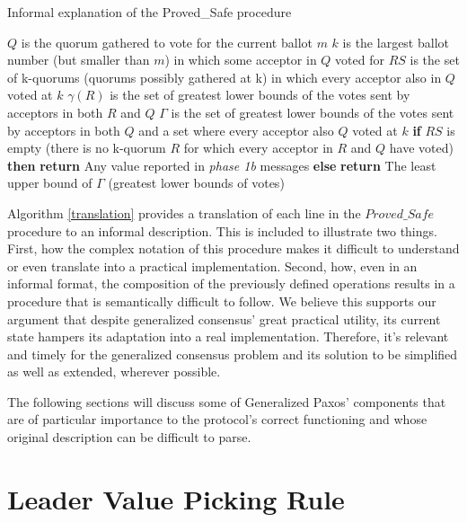 \begin{algorithm}
	\caption{Informal explanation of the Proved\_Safe procedure}
	\label{translation}
	\begin{algorithmic}[1]
		\State $Q$ is the quorum gathered to vote for the current ballot $m$
		\State $k$ is the largest ballot number (but smaller than $m$) in which some acceptor in $Q$ voted for 
		\State $RS$ is the set of k-quorums (quorums possibly gathered at k) in which every acceptor also in $Q$ voted at $k$
		\State $\gamma(R)$ is the set of greatest lower bounds of the votes sent by acceptors in both $R$ and $Q$
		\State $\Gamma$ is the set of greatest lower bounds of the votes sent by acceptors in both $Q$ and a set where every acceptor also $Q$ voted at $k$
		\State \textbf{if} $RS$ is empty (there is no k-quorum $R$ for which every acceptor in $R$ and $Q$ have voted) \textbf{then}
		\State \hspace{\algorithmicindent} \textbf{return} Any value reported in \textit{phase 1b} messages
		\State \textbf{else}
		\State \hspace{\algorithmicindent} \textbf{return} The least upper bound of $\Gamma$ (greatest lower bounds of votes)
		\EndFunction
		
	\end{algorithmic}
\end{algorithm}

Algorithm \ref{translation} provides a translation of each line in the $Proved\_Safe$ procedure to an informal description. This is included to illustrate two things. First, how the complex notation of this procedure makes it difficult to understand or even translate into a practical implementation. Second, how, even in an informal format, the composition of the previously defined operations results in a procedure that is semantically difficult to follow. We believe this supports our argument that despite generalized consensus' great practical utility, its current state hampers its adaptation into a real implementation. Therefore, it's relevant and timely for the generalized consensus problem and its solution to be simplified as well as extended, wherever possible.\par
The following sections will discuss some of Generalized Paxos' components that are of particular importance to the protocol's correct functioning and whose original description can be difficult to parse.

\section{Leader Value Picking Rule} \label{value_picking}

